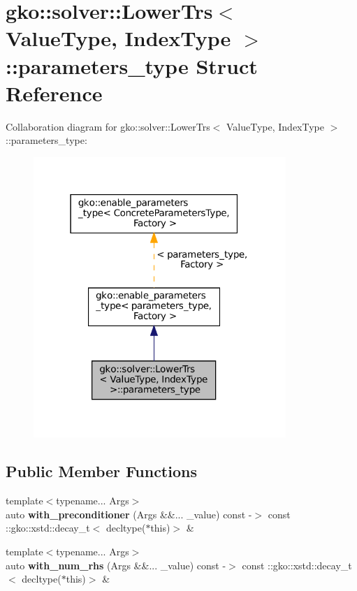 \hypertarget{structgko_1_1solver_1_1LowerTrs_1_1parameters__type}{}\section{gko\+:\+:solver\+:\+:Lower\+Trs$<$ Value\+Type, Index\+Type $>$\+:\+:parameters\+\_\+type Struct Reference}
\label{structgko_1_1solver_1_1LowerTrs_1_1parameters__type}


Collaboration diagram for gko\+:\+:solver\+:\+:Lower\+Trs$<$ Value\+Type, Index\+Type $>$\+:\+:parameters\+\_\+type\+:
\nopagebreak
\begin{figure}[H]
\begin{center}
\leavevmode
\includegraphics[width=271pt]{structgko_1_1solver_1_1LowerTrs_1_1parameters__type__coll__graph}
\end{center}
\end{figure}
\subsection*{Public Member Functions}
\begin{DoxyCompactItemize}
\item 
\mbox{\label{structgko_1_1solver_1_1LowerTrs_1_1parameters__type_a50930ebd4f0b4b1aa220aea402e6013b}} 
{\footnotesize template$<$typename... Args$>$ }\\auto {\bfseries with\+\_\+preconditioner} (Args \&\&... \+\_\+value) const -\/$>$ const \+::gko\+::xstd\+::decay\+\_\+t$<$ decltype($\ast$this)$>$ \&
\item 
\mbox{\label{structgko_1_1solver_1_1LowerTrs_1_1parameters__type_a052f9299a75dbd89c47bd85fd62ef9dd}} 
{\footnotesize template$<$typename... Args$>$ }\\auto {\bfseries with\+\_\+num\+\_\+rhs} (Args \&\&... \+\_\+value) const -\/$>$ const \+::gko\+::xstd\+::decay\+\_\+t$<$ decltype($\ast$this)$>$ \&
\end{DoxyCompactItemize}
